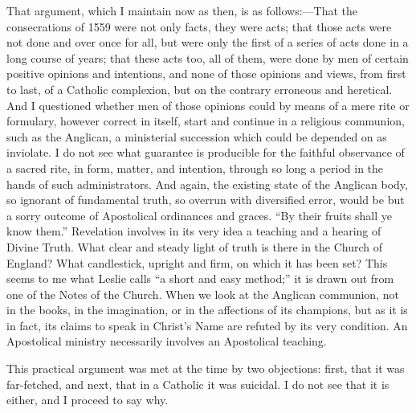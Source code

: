 That argument, which I maintain now as then, is as follows:—That
the consecrations of 1559 were not only facts, they were acts; that
those acts were not done and over once for all, but were only the
first of a series of acts done in a long course of years; that these
acts too, all of them, were done by men of certain positive opinions
and intentions, and none of those opinions and views, from first to
last, of a Catholic complexion, but on the contrary erroneous and
heretical. And I questioned whether men of those opinions could by
means of a mere rite or formulary, however correct in itself, start
and continue in a religious communion, such as the Anglican, a
ministerial succession which could be depended on as inviolate. I do
not see what guarantee is producible for the faithful observance of a
sacred rite, in form, matter, and intention, through so long a period
in the hands of such administrators. And again, the existing state of
the Anglican body, so ignorant of fundamental truth, so overrun with
diversified error, would be but a sorry outcome of Apostolical
ordinances and graces. ``By their fruits shall ye know them.''
Revelation involves in its very idea a teaching and a hearing of
Divine Truth. What clear and steady light of truth is there in the
Church of England? What candlestick, upright and firm, on which it has
been set? This seems to me what Leslie calls ``a short and easy
method;'' it is drawn out from one of the Notes of the Church.
When we look at the Anglican communion, not in the books, in the
imagination, or in the affections of its champions, but as it is in
fact, its claims to speak in Christ's Name are refuted by its very
condition. An Apostolical ministry necessarily involves an Apostolical
teaching.

This practical argument was met at the time by two objections:
first, that it was far-fetched, and next, that in a Catholic it
was suicidal. I do not see that it is either, and I proceed to say
why.

